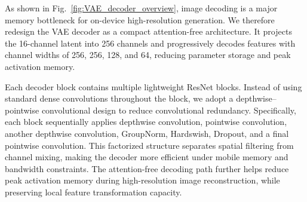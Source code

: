 As shown in Fig.~\ref{fig:VAE_decoder_overview}, image decoding is a major memory bottleneck for on-device high-resolution generation. We therefore redesign the VAE decoder as a compact attention-free architecture. It projects the 16-channel latent into 256 channels and progressively decodes features with channel widths of 256, 256, 128, and 64, reducing parameter storage and peak activation memory.

Each decoder block contains multiple lightweight ResNet blocks. Instead of using standard dense convolutions throughout the block, we adopt a depthwise--pointwise convolutional design to reduce convolutional redundancy. Specifically, each block sequentially applies depthwise convolution, pointwise convolution, another depthwise convolution, GroupNorm, Hardswish, Dropout, and a final pointwise convolution. This factorized structure separates spatial filtering from channel mixing, making the decoder more efficient under mobile memory and bandwidth constraints. The attention-free decoding path further helps reduce peak activation memory during high-resolution image reconstruction, while preserving local feature transformation capacity.

